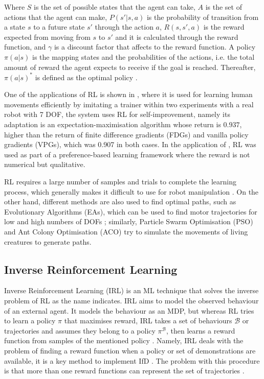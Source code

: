 \documentclass[thesis]{mas_proposal}
\begin{document}
    \begin{equation}
    [S, A, P(s'|s, a), R(s, s', a), \gamma]
    \label{eq:tuple_RL}
    \end{equation}
    
    Where $S$ is the set of possible states that the agent can take, $A$ is the set of actions that the agent can make, $P(s'|s, a)$ is the probability of transition from a state $s$ to a future state $s'$ through the action $a$, $R(s, s', a)$ is the reward expected from moving from $s$ to $s'$ and it is calculated through the reward function, and $\gamma$ is a discount factor that affects to the reward function. A policy $\pi(a|s)$ is the mapping states and the probabilities of the actions, i.e. the total amount of reward the agent expects to receive if the goal is reached. Thereafter, $\pi(a|s)^*$ is defined as the optimal policy \cite{Hussein2018, Elguea2023}. 
    
    One of the applications of RL is shown in \cite{Kober2010}, where it is used for learning human movements efficiently by imitating a trainer within two experiments with a real robot with 7 DOF, the system uses RL for self-improvement, namely its adaptation is an expectation-maximisation algorithm whose return is $0.937$, higher than the return of finite difference gradients (FDGs) and vanilla policy gradients (VPGs), which was 0.907 in both cases. In the application of \cite{Fuernkranz2012}, RL was used as part of a preference-based learning framework where the reward is not numerical but qualitative. 
    
    RL requires a large number of samples and trials to complete the learning process, which generally makes it difficult to use for robot manipulation \cite{Hua2021}. On the other hand, different methods are also used to find optimal paths, such as Evolutionary Algorithms (EAs), which can be used to find motor trajectories for low and high numbers of DOFs \cite{Nolfi2000}; similarly, Particle Swarm Optimisation (PSO) \cite{Zhang2015} and Ant Colony Optimisation (ACO) \cite{Zhang2010} try to simulate the movements of living creatures to generate paths.
    
    \subsection{Inverse Reinforcement Learning}
    
    Inverse Reinforcement Learning (IRL) is an ML technique that solves the inverse problem of RL as the name indicates. IRL aims to model the observed behaviour of an external agent. It models the behaviour as an MDP, but whereas RL tries to learn a policy $\pi$ that maximises reward, IRL takes a set of behaviours $\mathcal{B}$ or trajectories and assumes they belong to a policy $\pi^\mathcal{B}$, then learns a reward function from samples of the mentioned policy \cite{Heim2019}. Namely, IRL deals with the problem of finding a reward function when a policy or set of demonstrations are available, it is a key method to implement IfD \cite{Arora2021}. The problem with this procedure is that more than one reward functions can represent the set of trajectories \cite{Russell2000}. 
    
\end{document}
